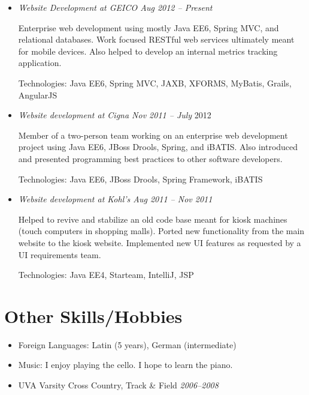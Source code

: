 \documentclass[a4paper,11pt]{article}
\begin{document}
  \vskip 5pt
  \begin{itemize}

    \item \textit{Website Development at GEICO \hfill Aug 2012 -- Present}

      Enterprise web development using mostly Java EE6, Spring MVC, and
      relational databases. Work focused RESTful web services ultimately meant
      for mobile devices. Also helped to develop an internal metrics tracking
      application.

      Technologies: Java EE6, Spring MVC, JAXB, XFORMS, MyBatis, Grails,
      AngularJS


    \item \textit{Website development at Cigna \hfill Nov 2011 -- July}
      2012

      Member of a two-person team working on an enterprise web development
      project using Java EE6, JBoss Drools, Spring, and iBATIS. Also introduced
      and presented programming best practices to other software developers.

      Technologies: Java EE6, JBoss Drools, Spring Framework, iBATIS

    \item \textit{Website development at Kohl's \hfill Aug 2011 -- Nov 2011}

      Helped to revive and stabilize an old code base meant for kiosk machines
      (touch computers in shopping malls). Ported new functionality from the
      main website to the kiosk website. Implemented new UI features as
      requested by a UI requirements team.

      Technologies: Java EE4, Starteam, IntelliJ, JSP

  \end{itemize}


\vskip 4pt
\section*{Other Skills/Hobbies}
\vskip 5pt

  \begin{itemize}
    \item Foreign Languages: Latin (5 years), German (intermediate)
    \item Music: I enjoy playing the cello. I hope to learn the piano.
    \item UVA Varsity Cross Country, Track \& Field \hfill \textit{2006--2008}
  \end{itemize}
\end{document}
